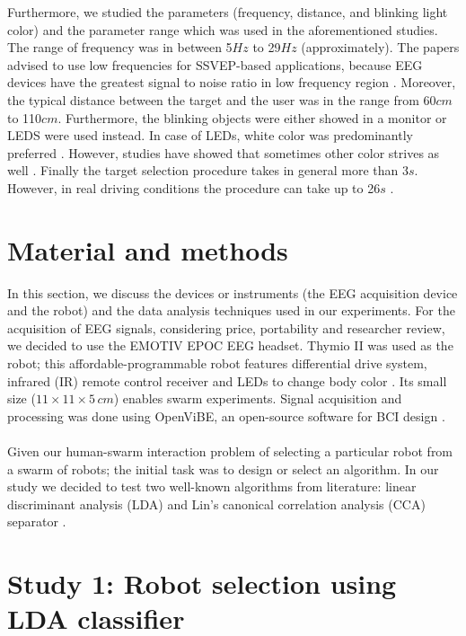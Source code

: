 \documentclass{svmult}
\begin{document}
Furthermore, we studied the parameters (frequency, distance, and blinking light color) and the parameter range which was used in the aforementioned studies. The range of frequency was in between 5$Hz$ to 29$Hz$ (approximately). The papers advised to use low frequencies for SSVEP-based applications, because EEG devices have the greatest signal to noise ratio in low frequency region \cite{paper6}. Moreover, the typical distance between the target and the user was in the range from 60$cm$ to 110$cm$. Furthermore, the blinking objects were either showed in a monitor or LEDS were used instead. In case of LEDs, white color was predominantly preferred \cite{aljshamee2014beyond, aljshamee2016discriminate}. However, studies have showed that sometimes other color strives as well \cite{SSVEPfiability}. Finally the target selection procedure takes in general more than 3$s$. However, in real driving conditions the procedure can take up to 26$s$ \cite{car}.

\section{Material and methods}
\label{sec:methods}
In this section, we discuss the devices or instruments (the EEG acquisition device and the robot) and the data analysis techniques used in our experiments. For the acquisition of EEG signals, considering price, portability and researcher review, we decided to use the EMOTIV EPOC EEG headset. Thymio II was used as the robot; this affordable-programmable robot features differential drive system, infrared (IR) remote control receiver and LEDs to change body color \cite{Riedo-et-al-2013}. Its small size ($11 \times 11 \times 5\,\mathit{cm}$) enables swarm experiments. Signal acquisition and processing was done using OpenViBE, an open-source software for BCI design \cite{ov_publication}.\\
\\
Given our human-swarm interaction problem of selecting a particular robot from a swarm of robots; the initial task was to design or select an algorithm. In our study we decided to test two well-known algorithms from literature: linear discriminant analysis (LDA) \cite{openvibeSSVEP} and Lin's canonical correlation analysis (CCA) separator \cite{Lin2014}.\\

\section{Study 1: Robot selection using LDA classifier}
\label{sec:ML_approach}
\end{document}
